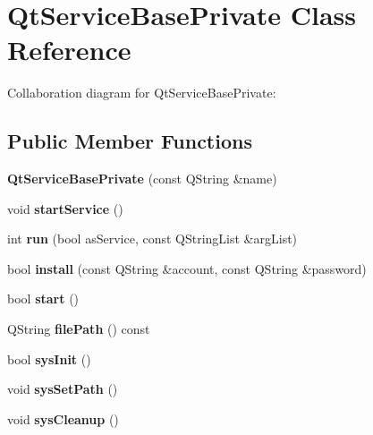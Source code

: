 \hypertarget{class_qt_service_base_private}{}\section{Qt\+Service\+Base\+Private Class Reference}
\label{class_qt_service_base_private}


Collaboration diagram for Qt\+Service\+Base\+Private\+:
\subsection*{Public Member Functions}
\begin{DoxyCompactItemize}
\item 
\mbox{\label{class_qt_service_base_private_a0a0e43286fe71580c6b6683b6afb3315}} 
{\bfseries Qt\+Service\+Base\+Private} (const Q\+String \&name)
\item 
\mbox{\label{class_qt_service_base_private_aba9704ace725a9c8603abac51b548173}} 
void {\bfseries start\+Service} ()
\item 
\mbox{\label{class_qt_service_base_private_a2ea81782bcb13927a60e0bf0d0772cc8}} 
int {\bfseries run} (bool as\+Service, const Q\+String\+List \&arg\+List)
\item 
\mbox{\label{class_qt_service_base_private_abd194ef7534f7c7c61e3a6126291cef2}} 
bool {\bfseries install} (const Q\+String \&account, const Q\+String \&password)
\item 
\mbox{\label{class_qt_service_base_private_a9f6c57d4daaaf630740d68357ab8b190}} 
bool {\bfseries start} ()
\item 
\mbox{\label{class_qt_service_base_private_abe479b544fa351138600eca1aa25605f}} 
Q\+String {\bfseries file\+Path} () const
\item 
\mbox{\label{class_qt_service_base_private_a33b5a1053664ec5fcffa1190e6321ed8}} 
bool {\bfseries sys\+Init} ()
\item 
\mbox{\label{class_qt_service_base_private_aa94178427a8a87d0d1e3a7051a51c1bb}} 
void {\bfseries sys\+Set\+Path} ()
\item 
\mbox{\label{class_qt_service_base_private_a0543878130d3a883380e14bc17c166ad}} 
void {\bfseries sys\+Cleanup} ()
\end{DoxyCompactItemize}
